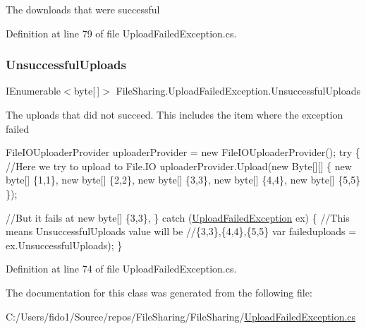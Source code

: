 The downloads that were successful 



Definition at line 79 of file Upload\+Failed\+Exception.\+cs.

\mbox{\label{class_file_sharing_1_1_upload_failed_exception_a8317cfafa75e732f435c85c50927ce79}} 
\subsubsection{\texorpdfstring{Unsuccessful\+Uploads}{UnsuccessfulUploads}}
{\footnotesize\ttfamily I\+Enumerable$<$byte\mbox{[}$\,$\mbox{]}$>$ File\+Sharing.\+Upload\+Failed\+Exception.\+Unsuccessful\+Uploads\hspace{0.3cm}{\ttfamily [get]}}



The uploads that did not succeed. This includes the item where the exception failed 


\begin{DoxyCode}
FileIOUploaderProvider uploaderProvider = \textcolor{keyword}{new} FileIOUploaderProvider();
\textcolor{keywordflow}{try}
\{
    \textcolor{comment}{//Here we try to upload to File.IO}
    uploaderProvider.Upload(\textcolor{keyword}{new} Byte[][]
                            \{
                            \textcolor{keyword}{new} byte[] \{1,1\},
                            \textcolor{keyword}{new} byte[] \{2,2\},
                            \textcolor{keyword}{new} byte[] \{3,3\},
                            \textcolor{keyword}{new} byte[] \{4,4\},
                            \textcolor{keyword}{new} byte[] \{5,5\}
                            \});

    \textcolor{comment}{//But it fails at new byte[] \{3,3\},}
\}
\textcolor{keywordflow}{catch} (\hyperlink{class_file_sharing_1_1_upload_failed_exception_a695f2b76a11171b4ac7b749eeeb8f09b}{UploadFailedException} ex)
\{
    \textcolor{comment}{//This means UnsuccessfulUploads value will be }
    \textcolor{comment}{//\{3,3\},\{4,4\},\{5,5\}}
    var faileduploads = ex.UnsuccessfulUploads);
\}        
\end{DoxyCode}
 

Definition at line 74 of file Upload\+Failed\+Exception.\+cs.



The documentation for this class was generated from the following file\+:\begin{DoxyCompactItemize}
\item 
C\+:/\+Users/fido1/\+Source/repos/\+File\+Sharing/\+File\+Sharing/\hyperlink{_upload_failed_exception_8cs}{Upload\+Failed\+Exception.\+cs}\end{DoxyCompactItemize}
